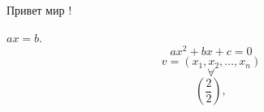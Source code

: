 


    Привет мир ! 
    
    $ax = b$.
    \[
    ax^2 + bx + c = 0
    \]
    \[
    v = (x_{1}, x_{2}, \dots, x_{n})
    \]
    \[\forall\]
    \[
    \left (\frac{2}{2} \right), 
    \]
